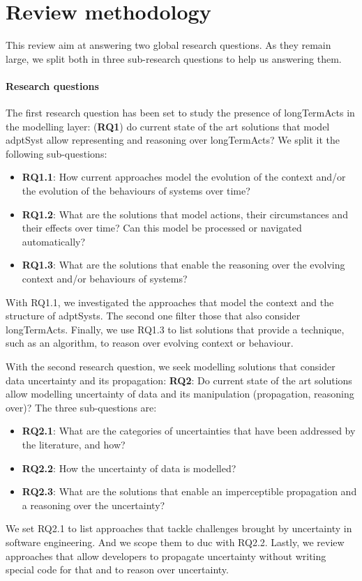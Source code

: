 \section{Review methodology}
\label{sec:sota:methodo}

This review aim at answering two global research questions.
As they remain large, we split both in three sub-research questions to help us answering them.

\paragraph{Research questions}
The first research question has been set to study the presence of \glspl{longTermAct} in the modelling layer: (\textbf{RQ1}) do current state of the art solutions that model \gls{adptSyst} allow representing and reasoning over \glspl{longTermAct}?
We split it the following sub-questions:
\begin{itemize}
	\item \textbf{RQ1.1}: How current approaches model the evolution of the context and/or the evolution of the behaviours of systems over time?
	\item \textbf{RQ1.2}: What are the solutions that model actions, their circumstances and their effects over time? Can this model be processed or navigated automatically?
	\item \textbf{RQ1.3}: What are the solutions that enable the reasoning over the evolving context and/or behaviours of systems?
\end{itemize}
With RQ1.1, we investigated the approaches that model the context and the structure of \glspl{adptSyst}.
The second one filter those that also consider \glspl{longTermAct}.
Finally, we use RQ1.3 to list solutions that provide a technique, such as an algorithm, to reason over evolving context or behaviour.

With the second research question, we seek modelling solutions that consider data uncertainty and its propagation: \textbf{RQ2}: Do current state of the art solutions allow modelling uncertainty of data and its manipulation (propagation, reasoning over)?
The three sub-questions are:
\begin{itemize}
	\item \textbf{RQ2.1}: What are the categories of uncertainties that have been addressed by the literature, and how?
	\item \textbf{RQ2.2}: How the uncertainty of data is modelled?
	\item \textbf{RQ2.3}: What are the solutions that enable an imperceptible propagation and a reasoning over the uncertainty?
\end{itemize}
We set RQ2.1 to list approaches that tackle challenges brought by uncertainty in software engineering.
And we scope them to \gls{duc} with RQ2.2.
Lastly, we review approaches that allow developers to propagate uncertainty without writing special code for that and to reason over uncertainty.

